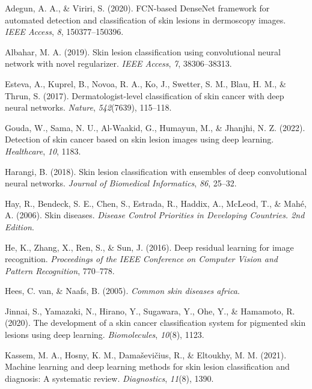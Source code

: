 \documentclass[
  12pt,
  oneside]{article}
\newlength{\cslhangindent}
\newenvironment{CSLReferences}[2] %
 {\begin{list}{}{%
  \setlength{\itemindent}{0pt}
  \setlength{\leftmargin}{0pt}
  \setlength{\parsep}{0pt}
  \ifodd #1
   \setlength{\leftmargin}{\cslhangindent}
   \setlength{\itemindent}{-1\cslhangindent}
  \fi
  \setlength{\itemsep}{#2\baselineskip}}}
 {\end{list}}
\begin{document}
\label{refs}
\begin{CSLReferences}{1}{0}
Adegun, A. A., \& Viriri, S. (2020). FCN-based DenseNet framework for
automated detection and classification of skin lesions in dermoscopy
images. \emph{IEEE Access}, \emph{8}, 150377--150396.

Albahar, M. A. (2019). Skin lesion classification using convolutional
neural network with novel regularizer. \emph{IEEE Access}, \emph{7},
38306--38313.

Esteva, A., Kuprel, B., Novoa, R. A., Ko, J., Swetter, S. M., Blau, H.
M., \& Thrun, S. (2017). Dermatologist-level classification of skin
cancer with deep neural networks. \emph{Nature}, \emph{542}(7639),
115--118.

Gouda, W., Sama, N. U., Al-Waakid, G., Humayun, M., \& Jhanjhi, N. Z.
(2022). Detection of skin cancer based on skin lesion images using deep
learning. \emph{Healthcare}, \emph{10}, 1183.

Harangi, B. (2018). Skin lesion classification with ensembles of deep
convolutional neural networks. \emph{Journal of Biomedical Informatics},
\emph{86}, 25--32.

Hay, R., Bendeck, S. E., Chen, S., Estrada, R., Haddix, A., McLeod, T.,
\& Mahé, A. (2006). Skin diseases. \emph{Disease Control Priorities in
Developing Countries. 2nd Edition}.

He, K., Zhang, X., Ren, S., \& Sun, J. (2016). Deep residual learning
for image recognition. \emph{Proceedings of the IEEE Conference on
Computer Vision and Pattern Recognition}, 770--778.

Hees, C. van, \& Naafs, B. (2005). \emph{Common skin diseases africa}.

Jinnai, S., Yamazaki, N., Hirano, Y., Sugawara, Y., Ohe, Y., \&
Hamamoto, R. (2020). The development of a skin cancer classification
system for pigmented skin lesions using deep learning.
\emph{Biomolecules}, \emph{10}(8), 1123.

Kassem, M. A., Hosny, K. M., Damaševičius, R., \& Eltoukhy, M. M.
(2021). Machine learning and deep learning methods for skin lesion
classification and diagnosis: A systematic review. \emph{Diagnostics},
\emph{11}(8), 1390.


\end{CSLReferences}
\end{document}
